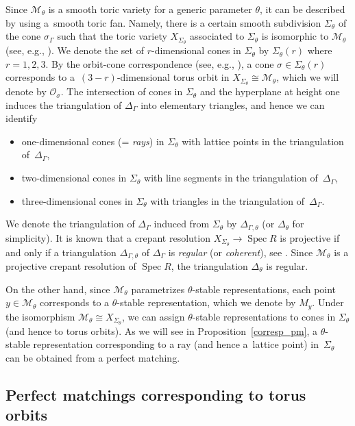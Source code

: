 \documentclass[pdftex]{sigma}
\numberwithin{equation}{section}
\theoremstyle{definition}
\newcommand{\calM}{\mathcal{M}}
\newcommand{\calO}{\mathcal{O}}
\newcommand{\Spec}{\operatorname{Spec}}
\begin{document}
Since $\calM_\theta$ is a smooth toric variety for a generic parameter $\theta$, it can be described by using a~smooth toric fan.
Namely, there is a certain smooth subdivision $\Sigma_\theta$ of the cone $\sigma_\Gamma$
such that the toric variety $X_{\Sigma_\theta}$ associated to $\Sigma_\theta$ is isomorphic to $\calM_\theta$ (see, e.g., \cite[Chapter~11]{CLS}).
We denote the set of $r$-dimensional cones in $\Sigma_\theta$ by $\Sigma_\theta(r)$ where $r=1, 2, 3$.
By the orbit-cone correspondence (see, e.g., \cite[Chapter~3]{CLS}), a cone $\sigma\in\Sigma_\theta(r)$ corresponds to a~$(3-r)$-dimensional
torus orbit in $X_{\Sigma_\theta}\cong\calM_\theta$, which we will denote by $\calO_\sigma$.
The intersection of cones in $\Sigma_\theta$ and the hyperplane at height one induces the triangulation of $\Delta_\Gamma$ into elementary triangles,
and hence we can identify
\begin{itemize}\itemsep=0pt
\item one-dimensional cones (= \emph{rays}) in $\Sigma_\theta$ with lattice points in the triangulation of~$\Delta_\Gamma$,
\item two-dimensional cones in $\Sigma_\theta$ with line segments in the triangulation of~$\Delta_\Gamma$,
\item three-dimensional cones in $\Sigma_\theta$ with triangles in the triangulation of~$\Delta_\Gamma$.
\end{itemize}
We denote the triangulation of $\Delta_\Gamma$ induced from $\Sigma_\theta$ by $\Delta_{\Gamma, \theta}$ (or $\Delta_\theta$ for simplicity).
It is known that a crepant resolution $X_{\Sigma_\theta}\to \Spec R$ is projective if and only if a triangulation $\Delta_{\Gamma, \theta}$ of $\Delta_\Gamma$ is \emph{regular} (or \emph{coherent}), see \cite[Proposition~2.4]{dais2001all}.
Since $\calM_\theta$ is a projective crepant resolution of $\Spec R$, the triangulation $\Delta_\theta$ is regular.


On the other hand, since $\calM_\theta$ parametrizes $\theta$-stable representations,
each point $y\in\calM_\theta$ corresponds to a $\theta$-stable representation, which we denote by $M_y$.
Under the isomorphism $\calM_\theta\cong X_{\Sigma_\theta}$,
we can assign $\theta$-stable representations to cones in $\Sigma_\theta$ (and hence to torus orbits).
As we will see in Proposition~\ref{corresp_pm}, a $\theta$-stable representation corresponding to a ray (and hence a~lattice point) in~$\Sigma_\theta$
can be obtained from a perfect matching.

\subsection{Perfect matchings corresponding to torus orbits}\label{subsec_cone_pm}
\end{document}
